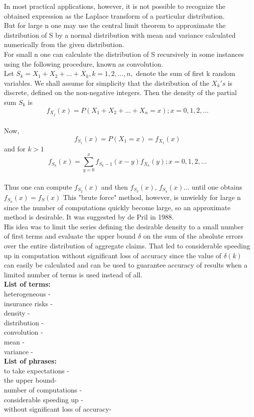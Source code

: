 \documentclass[12pt]{article}
\begin{document}
 In most practical applications, however, it is not possible to recognize the obtained expression as the Laplace transform of a particular distribution. \\
 But for large n one may use the central limit theorem to approximate the distribution of S by a normal distribution with mean and variance calculated numerically from  the given distribution.\\
 For small n one can calculate the distribution of S recursively in some instances using the following procedure, known as convolution.\\
 Let $S_k=X_1 + X_2 +\dots+ X_k, k=1,2, \dots ,n,$ denote the sum of first k random variables. We shall assume for simplicity that the distribution of the $X_k's$ is discrete, defined on the non-negative integers. Then the density of the partial sum $S_k$ is \\
 $$f_{X_j}(x)=P(X_1 + X_2 +\dots+ X_n=x); x=0,1,2,\dots$$\\
 Now, $$f_{S_1}(x)=P(X_1=x)=f_{X_1}(x)$$ and for $k>1$ $$f_{S_k}(x)=\sum_{y=0}^x  f_{S_k-1}(x-y)f_{X_k}(y); x=0,1,2,\dots$$\\
 
 Thus one can compute $f_{S_2}(x)$ and then $f_{S_3}(x)$, $f_{S_4}(x) \dots $ until  one obtains $f_{S_n}(x)=f_S(x)$
 This "brute force" method, however, is unwieldy for large n since the number of computations quickly become large, so an approximate method is desirable. It was suggested by de Pril in 1988.\\
 
 His idea was to limit the series defining the desirable density to a small number of first  terms and evaluate the upper bound $\delta$  on the sum of the absolute errors over the entire distribution of aggregate claims. That led to considerable  speeding up in computation without significant loss of accuracy since  the value of $\delta(k)$ can  easily  be calculated and can be used to guarantee accuracy of results when a limited number of terms is used instead of all.\\
 
 {\bf List of terms:}\\
 heterogeneous - \\
 insurance risks - \\
 density - \\
 distribution - \\
 convolution - \\
 mean -\\
 variance -\\
 
 {\bf List of phrases:}\\
 to take expectations - \\
the upper bound-\\
number of computations -\\
considerable speeding up -\\
without significant loss of accuracy-\\
\end{document}
